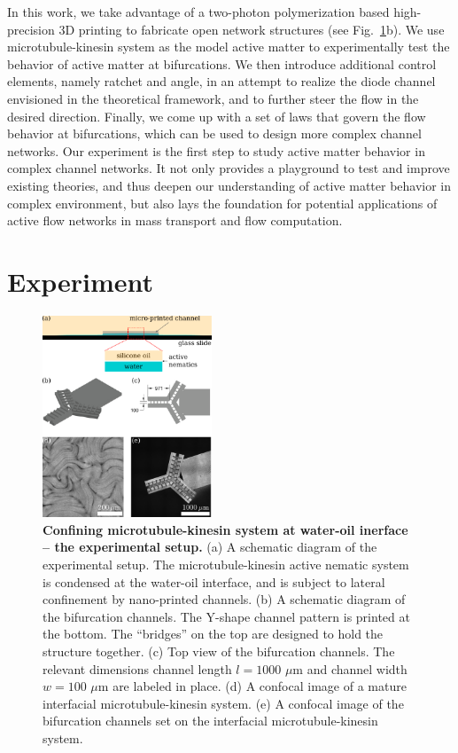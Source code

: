 \documentclass[%
10pt,
superscriptaddress,
twocolumn,
 amsmath,amssymb,
 aps,prx,
]{revtex4-2}
\begin{document}
In this work, we take advantage of a two-photon polymerization based high-precision 3D printing to fabricate open network structures (see Fig.~\ref{fig:bifurcation-experiment}b). 
We use microtubule-kinesin system as the model active matter to experimentally test the behavior of active matter at bifurcations.
We then introduce additional control elements, namely ratchet and angle, in an attempt to realize the diode channel envisioned in the theoretical framework, and to further steer the flow in the desired direction.
Finally, we come up with a set of laws that govern the flow behavior at bifurcations, which can be used to design more complex channel networks.
Our experiment is the first step to study active matter behavior in complex channel networks.
It not only provides a playground to test and improve existing theories, and thus deepen our understanding of active matter behavior in complex environment, but also lays the foundation for potential applications of active flow networks in mass transport and flow computation. 



\section{Experiment}

\begin{figure}[!h]
    \includegraphics[width=0.45\textwidth]{2-bifurcation-experiment}
    \caption{
    \textbf{Confining microtubule-kinesin system at water-oil inerface -- the experimental setup.}
    (a) A schematic diagram of the experimental setup. 
    The microtubule-kinesin active nematic system is condensed at the water-oil interface, and is subject to lateral confinement by nano-printed channels. 
    (b) A schematic diagram of the bifurcation channels. 
    The Y-shape channel pattern is printed at the bottom.
    The ``bridges'' on the top are designed to hold the structure together. 
    (c) Top view of the bifurcation channels. 
    The relevant dimensions channel length $l=1000$ $\mu$m and channel width $w=100$ $\mu$m are labeled in place. 
    (d) A confocal image of a mature interfacial microtubule-kinesin system. 
    (e) A confocal image of the bifurcation channels set on the interfacial microtubule-kinesin system. 
    }
    \label{fig:bifurcation-experiment}
\end{figure}
\end{document}
